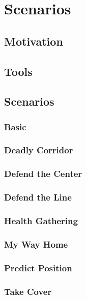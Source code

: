 
\chapter{Scenarios}

\section{Motivation}

\section{Tools}

\section{Scenarios}
\subsection{Basic}
\subsection{Deadly Corridor}
\subsection{Defend the Center}
\subsection{Defend the Line}
\subsection{Health Gathering}
\subsection{My Way Home}
\subsection{Predict Position}
\subsection{Take Cover}

